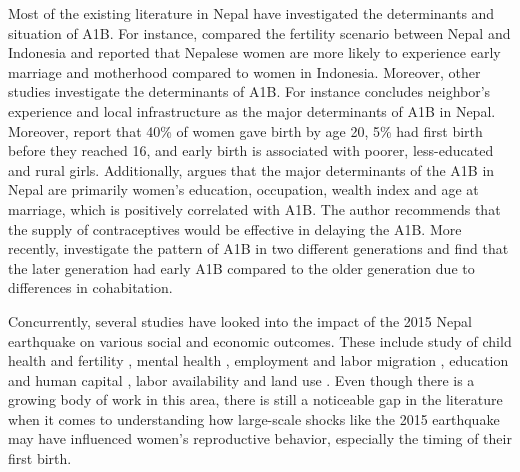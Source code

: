 \documentclass[11pt,a4paper]{article}
\begin{document}
Most of the existing literature in Nepal have investigated the determinants and situation of A1B. For instance, \citet{choe2001early} compared the fertility scenario between Nepal and Indonesia and reported that Nepalese women are more likely to experience early marriage and motherhood compared to women in Indonesia. Moreover, other studies investigate the determinants of A1B. For instance \citet{ghimire2017social} concludes neighbor's experience and local infrastructure as the major determinants of A1B in Nepal. Moreover, \citet{neal2019using} report that 40\% of women gave birth by age 20, 5\% had first birth before they reached 16, and early birth is associated with poorer, less-educated and rural girls. Additionally, \citet{khanal2021determinant} argues that the major determinants of the A1B in Nepal are primarily women’s education, occupation, wealth index and age at marriage, which is positively correlated with A1B. The author recommends that the supply of contraceptives would be effective in delaying the A1B. More recently, \citet{marphatia2024generational} investigate the pattern of A1B in two different generations and find that the later generation had early A1B compared to the older generation due to differences in cohabitation.   


\vspace{0.25 cm}

Concurrently, several studies have looked into the impact of the 2015 Nepal earthquake on various social and economic outcomes. These include study of child health and fertility \citep{khatri2020experiences, pun2023impact}, mental health \citep{kane2018mental}, employment and labor migration \citep{shakya2022natural}, education and human capital \citep{raut2022impact}, labor availability and land use \citep{dicarlo2018post}. Even though there is a growing body of work in this area, there is still a noticeable gap in the literature when it comes to understanding how large-scale shocks like the 2015 earthquake may have influenced women’s reproductive behavior, especially the timing of their first birth.



\vspace{0.25 cm}
\end{document}
